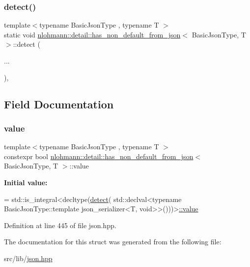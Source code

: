 \subsubsection{\texorpdfstring{detect()}{detect()}\hspace{0.1cm}{\footnotesize\ttfamily [2/2]}}
{\footnotesize\ttfamily template$<$typename Basic\+Json\+Type , typename T $>$ \\
static void \hyperlink{structnlohmann_1_1detail_1_1has__non__default__from__json}{nlohmann\+::detail\+::has\+\_\+non\+\_\+default\+\_\+from\+\_\+json}$<$ Basic\+Json\+Type, T $>$\+::detect (\begin{DoxyParamCaption}\item[{}]{... }\end{DoxyParamCaption})\hspace{0.3cm}{\ttfamily [static]}, {\ttfamily [private]}}



\subsection{Field Documentation}
\mbox{\label{structnlohmann_1_1detail_1_1has__non__default__from__json_ad34bb7cd3961fcafc2c5047a9782e931}} 
\subsubsection{\texorpdfstring{value}{value}}
{\footnotesize\ttfamily template$<$typename Basic\+Json\+Type , typename T $>$ \\
constexpr bool \hyperlink{structnlohmann_1_1detail_1_1has__non__default__from__json}{nlohmann\+::detail\+::has\+\_\+non\+\_\+default\+\_\+from\+\_\+json}$<$ Basic\+Json\+Type, T $>$\+::value\hspace{0.3cm}{\ttfamily [static]}}

{\bfseries Initial value\+:}
\begin{DoxyCode}
= std::is\_integral<decltype(\hyperlink{structnlohmann_1_1detail_1_1has__non__default__from__json_a87428058d4e01d8f034ec5b2574795a3}{detect}(
                                      std::declval<\textcolor{keyword}{typename} BasicJsonType::template json\_serializer<T,
       void>>()))>\hyperlink{structnlohmann_1_1detail_1_1has__non__default__from__json_ad34bb7cd3961fcafc2c5047a9782e931}{::value}
\end{DoxyCode}


Definition at line 445 of file json.\+hpp.



The documentation for this struct was generated from the following file\+:\begin{DoxyCompactItemize}
\item 
src/lib/\hyperlink{json_8hpp}{json.\+hpp}\end{DoxyCompactItemize}
